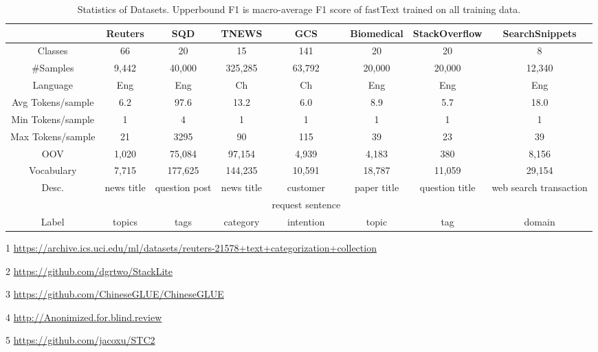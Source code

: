 \begin{table}[th]
	\scriptsize
	\centering
	\begin{threeparttable}
	\begin{tabular}{cccccccc}
		\toprule
		& Reuters\tnote{1}    & SQD \tnote{2}   & TNEWS \tnote{3}   & GCS\tnote{4} & Biomedical\tnote{5} & StackOverflow\tnote{5} & SearchSnippets\tnote{5}    \\ \hline
		Classes       & 66         & 20            & 15         & 141           &20&20&8            \\
		\#Samples     & 9,442      & 40,000        & 325,285    & 63,792           &20,000&20,000&12,340         \\
		Language      & Eng        & Eng           & Ch         & Ch           & Eng        & Eng    & Eng          \\
		Avg Tokens/sample & 6.2        & 97.6          & 13.2        &     6.0     &8.9&5.7&18.0          \\
		Min Tokens/sample & 1 & 4 & 1 & 1 &1&1&1\\
		Max Tokens/sample & 21 & 3295 & 90 & 115 &39&23&39\\
		
		OOV &1,020 &75,084&97,154&4,939&4,183&380&8,156\\
		Vocabulary& 7,715&177,625&144,235&10,591&18,787&11,059&29,154\\
		Desc.         & news title & question post & news title & customer &paper title&question title&web search transaction
   \\ 
	& & & & request sentence &&&\\
		Label         & topics     & tags          & category   & intention                 &topic&tag&domain\\
		\bottomrule              
	\end{tabular}


\begin{tablenotes}
	\item[1] \url{https://archive.ics.uci.edu/ml/datasets/reuters-21578+text+categorization+collection}
	\item[2] \url{https://github.com/dgrtwo/StackLite}
	\item[3] \url{https://github.com/ChineseGLUE/ChineseGLUE}
	\item[4] \url{http://Anonimized.for.blind.review}
	\item[5] \url{https://github.com/jacoxu/STC2}
\end{tablenotes}
\end{threeparttable}
\caption{Statistics of Datasets.
	Upperbound F1 is macro-average F1 score of fastText trained on all 
	training data.}
\label{table:statsOfDataset}
\end{table}
